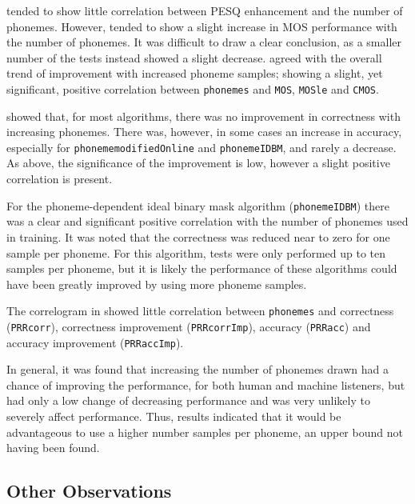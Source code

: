 \clearpage{}

 tended to show little correlation between
\ac{PESQ} enhancement and the number of phonemes. However, 
tended to show a slight increase in \ac{MOS} performance with the
number of phonemes. It was difficult to draw a clear conclusion, as
a smaller number of the tests instead showed a slight decrease. 
agreed with the overall trend of improvement with increased phoneme
samples; showing a slight, yet significant, positive correlation between
\lstinline!phonemes! and \lstinline!MOS!, \lstinline!MOSle! and
\lstinline!CMOS!.

 showed
that, for most algorithms, there was no improvement in correctness
with increasing phonemes. There was, however, in some cases an increase
in accuracy, especially for \lstinline!phonememodifiedOnline! and
\lstinline!phonemeIDBM!, and rarely a decrease. As above, the significance
of the improvement is low, however a slight positive correlation is
present.

For the phoneme-dependent ideal binary mask algorithm (\lstinline!phonemeIDBM!)
there was a clear and significant positive correlation with the number
of phonemes used in training. It was noted that the correctness was
reduced near to zero for one sample per phoneme. For this algorithm,
tests were only performed up to ten samples per phoneme, but it is
likely the performance of these algorithms could have been greatly
improved by using more phoneme samples. 

The correlogram in  showed little correlation between
\lstinline!phonemes! and correctness (\lstinline!PRRcorr!), correctness
improvement (\lstinline!PRRcorrImp!), accuracy (\lstinline!PRRacc!)
and accuracy improvement (\lstinline!PRRaccImp!).

In general, it was found that increasing the number of phonemes drawn
had a chance of improving the performance, for both human and machine
listeners, but had only a low change of decreasing performance and
was very unlikely to severely affect performance. Thus, results indicated
that it would be advantageous to use a higher number samples per phoneme,
an upper bound not having been found.


\subsection{Other Observations}

